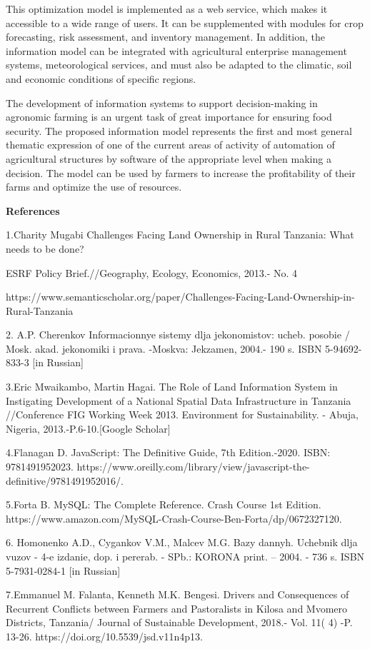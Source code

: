 This optimization model is implemented as a web service, which makes it
accessible to a wide range of users. It can be supplemented with modules
for crop forecasting, risk assessment, and inventory management. In
addition, the information model can be integrated with agricultural
enterprise management systems, meteorological services, and must also be
adapted to the climatic, soil and economic conditions of specific
regions.

The development of information systems to support decision-making in
agronomic farming is an urgent task of great importance for ensuring
food security. The proposed information model represents the first and
most general thematic expression of one of the current areas of activity
of automation of agricultural structures by software of the appropriate
level when making a decision. The model can be used by farmers to
increase the profitability of their farms and optimize the use of
resources.

{\bfseries References}

1.Charity Mugabi Challenges Facing Land Ownership in Rural Tanzania:
What needs to be done?

ESRF Policy Brief.//Geography, Ecology, Economics, 2013.- No. 4

https://www.semanticscholar.org/paper/Challenges-Facing-Land-Ownership-in-Rural-Tanzania

2. A.P. Cherenkov Informacionnye sistemy dlja jekonomistov: ucheb.
posobie / Mosk. akad. jekonomiki i prava. -Moskva: Jekzamen, 2004.- 190
s. ISBN 5-94692-833-3 {[}in Russian{]}

3.Eric Mwaikambo, Martin Hagai. The Role of Land Information System in
Instigating Development of a National Spatial Data Infrastructure in
Tanzania //Conference FIG Working Week 2013. Environment for
Sustainability. - Abuja, Nigeria, 2013.-P.6-10.{[}Google Scholar{]}

4.Flanagan D. JavaScript: The Definitive Guide, 7th Edition.-2020. ISBN:
9781491952023.
https://www.oreilly.com/library/view/javascript-the-definitive/9781491952016/.

5.Forta B. MySQL: The Complete Reference. Crash Course 1st Edition.
https://www.amazon.com/MySQL-Crash-Course-Ben-Forta/dp/0672327120.

6. Homonenko A.D., Cygankov V.M., Mal\textquotesingle cev M.G. Bazy
dannyh. Uchebnik dlja vuzov - 4-e izdanie, dop. i pererab. - SPb.:
KORONA print. -- 2004. - 736 s. ISBN 5-7931-0284-1 {[}in Russian{]}

7.Emmanuel M. Falanta, Kenneth M.K. Bengesi. Drivers and Consequences of
Recurrent Conflicts between Farmers and Pastoralists in Kilosa and
Mvomero Districts, Tanzania/ Journal of Sustainable Development, 2018.-
Vol. 11( 4) -P. 13-26. https://doi.org/10.5539/jsd.v11n4p13. \hl{}

